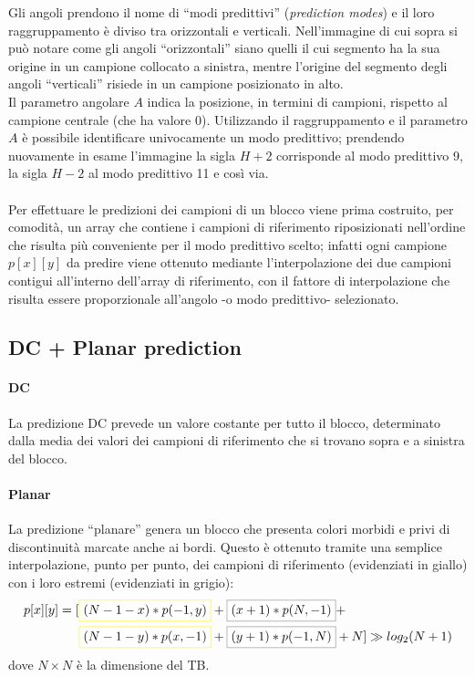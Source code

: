 Gli angoli prendono il nome di ``modi predittivi'' (\emph{prediction modes}) e 
il loro raggruppamento è diviso tra orizzontali e verticali.
Nell'immagine di cui sopra si può notare come gli angoli ``orizzontali'' siano 
quelli il cui segmento ha la sua origine in un campione collocato a sinistra, 
mentre l'origine del segmento degli angoli ``verticali'' risiede in un campione 
posizionato in alto.\\
Il parametro angolare $A$ indica la posizione, in termini di campioni, rispetto 
al campione centrale (che ha valore $0$).
Utilizzando il raggruppamento e il parametro $A$ è possibile identificare 
univocamente un modo predittivo; prendendo nuovamente in esame l'immagine la 
sigla $H+2$ corrisponde al modo predittivo 9, la sigla $H-2$ al modo predittivo 
11 e così via.
\\ \\
Per effettuare le predizioni dei campioni di un blocco viene prima costruito, 
per comodità, un array che contiene i campioni di riferimento riposizionati 
nell'ordine che risulta più conveniente per il modo predittivo scelto; infatti 
ogni campione $p[x][y]$ da predire viene ottenuto mediante l'interpolazione dei 
due campioni contigui all'interno dell'array di riferimento, con il fattore di 
interpolazione che risulta essere proporzionale all'angolo -o modo predittivo- 
selezionato.

\subsection{DC + Planar prediction }
\paragraph*{DC} La predizione DC prevede un valore costante per tutto il 
blocco, determinato dalla media dei valori dei campioni di riferimento che si 
trovano sopra e a sinistra del blocco.

\paragraph*{Planar} La predizione ``planare'' genera un blocco che presenta 
colori morbidi e privi di discontinuità marcate anche ai bordi. Questo è 
ottenuto tramite una semplice interpolazione, punto per punto, dei campioni di 
riferimento (evidenziati in giallo) con i loro estremi (evidenziati in grigio):
\begin{align*}
p[x][y] = 
[&\fcolorbox{yellow}{white}{$(N-1-x)*p(-1,y)$}+
  \fcolorbox{black!50}{white}{$(x+1)*p(N,-1)$}+\\
 &\fcolorbox{yellow}{white}{$(N-1-y)*p(x,-1)$}+
  \fcolorbox{black!50}{white}{$(y+1)*p(-1,N)$}+N] \gg log_2(N+1)
\end{align*} 
dove $N{\times}N$ è la dimensione del TB.

